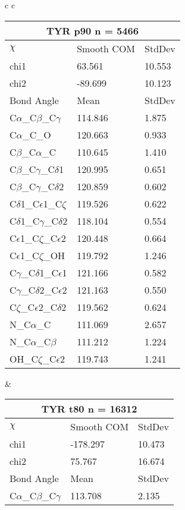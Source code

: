 \begin{longtable}{ c c }

  \begin{tabular}{ l l l }
  \toprule
  \multicolumn{3}{c}{TYR \textbf{p90} n = 5466} \\ \toprule
  $\chi$       & Smooth COM & StdDev \\ \midrule
  chi1 & 63.561 & 10.553 \\ 
  chi2 & -89.699 & 10.123 \\ \midrule
  Bond Angle   & Mean     & StdDev \\ \midrule
  C$\alpha$\_C$\beta$\_C$\gamma$ & 114.846 & 1.875\\
  C$\alpha$\_C\_O & 120.663 & 0.933\\
  C$\beta$\_C$\alpha$\_C & 110.645 & 1.410\\
  C$\beta$\_C$\gamma$\_C$\delta$1 & 120.995 & 0.651\\
  C$\beta$\_C$\gamma$\_C$\delta$2 & 120.859 & 0.602\\
  C$\delta$1\_C$\epsilon$1\_C$\zeta$ & 119.526 & 0.622\\
  C$\delta$1\_C$\gamma$\_C$\delta$2 & 118.104 & 0.554\\
  C$\epsilon$1\_C$\zeta$\_C$\epsilon$2 & 120.448 & 0.664\\
  C$\epsilon$1\_C$\zeta$\_OH & 119.792 & 1.246\\
  C$\gamma$\_C$\delta$1\_C$\epsilon$1 & 121.166 & 0.582\\
  C$\gamma$\_C$\delta$2\_C$\epsilon$2 & 121.163 & 0.550\\
  C$\zeta$\_C$\epsilon$2\_C$\delta$2 & 119.562 & 0.624\\
  N\_C$\alpha$\_C & 111.069 & 2.657\\
  N\_C$\alpha$\_C$\beta$ & 111.212 & 1.224\\
  OH\_C$\zeta$\_C$\epsilon$2 & 119.743 & 1.241\\
  \bottomrule
  \end{tabular}
  &
  \begin{tabular}{ l l l }
  \toprule
  \multicolumn{3}{c}{TYR \textbf{t80} n = 16312} \\ \toprule
  $\chi$       & Smooth COM & StdDev \\ \midrule
  chi1 & -178.297 & 10.473 \\ 
  chi2 & 75.767 & 16.674 \\ \midrule
  Bond Angle   & Mean     & StdDev \\ \midrule
  C$\alpha$\_C$\beta$\_C$\gamma$ & 113.708 & 2.135\\

\end{tabular}
\end{longtable}
